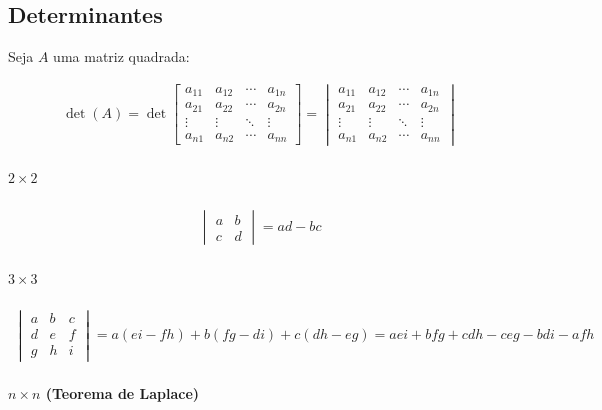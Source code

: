 \documentclass{article}
\begin{document}
\bigskip

\subsection{Determinantes}

Seja $A$ uma matriz quadrada:

\begin{gather*}
\det(A)
=
\det
\begin{bmatrix}
a_{11} & a_{12} & \cdots & a_{1n} \\
a_{21} & a_{22} & \cdots & a_{2n} \\
\vdots & \vdots & \ddots & \vdots \\
a_{n1} & a_{n2} & \cdots & a_{nn}
\end{bmatrix}
=
\begin{vmatrix}
a_{11} & a_{12} & \cdots & a_{1n} \\
a_{21} & a_{22} & \cdots & a_{2n} \\
\vdots & \vdots & \ddots & \vdots \\
a_{n1} & a_{n2} & \cdots & a_{nn}
\end{vmatrix}
\end{gather*}

\paragraph{$2 \times 2$}

\begin{gather*}
\begin{vmatrix}
a & b \\
c & d
\end{vmatrix}
= ad - bc
\end{gather*}

\paragraph{$3 \times 3$}

\begin{gather*}
\begin{vmatrix}
a & b & c \\
d & e & f \\
g & h & i
\end{vmatrix}
= a(ei - fh) + b(fg - di) + c(dh - eg)
= aei + bfg + cdh - ceg - bdi - afh
\end{gather*}

\paragraph{$n \times n$ (Teorema de Laplace)}
\end{document}

